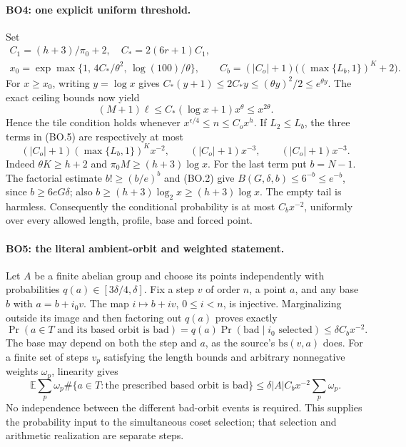 \paragraph{BO4: one explicit uniform threshold.}
Set
\[
\begin{gathered}
 C_1=(h+3)/\pi_0+2,\quad C_*=2(6r+1)C_1,\\
 x_0=\exp\max\{1,\,4C_*/\theta^2,\,\log(100)/\theta\},\qquad
 C_b=(|C_o|+1)\bigl((\max\{L_b,1\})^K+2\bigr).
\end{gathered}                                                   \tag{BO.6}
\]
For $x\ge x_0$, writing $y=\log x$ gives
$C_*(y+1)\le2C_*y\le(\theta y)^2/2\le e^{\theta y}$.
The exact ceiling bounds now yield
\[
 (M+1)\ell\le C_*(\log x+1)x^\theta
             \le x^{2\theta}.                                  \tag{BO.7}
\]
Hence the tile condition holds whenever
$x^{\epsilon/4}\le n\le C_ox^h$. If $L_2\le L_b$, the three terms
in (BO.5) are respectively at most
\[
 (|C_o|+1)(\max\{L_b,1\})^Kx^{-2},\qquad
 (|C_o|+1)x^{-3},\qquad (|C_o|+1)x^{-3}.                         \tag{BO.8}
\]
Indeed $\theta K\ge h+2$ and $\pi_0M\ge(h+3)\log x$.
For the last term put $b=N-1$. The factorial estimate
$b!\ge(b/e)^b$ and (BO.2) give
$B(G,\delta,b)\le6^{-b}\le e^{-b}$, since $b\ge6eG\delta$;
also $b\ge(h+3)\log_2x\ge(h+3)\log x$. The empty tail is harmless.
Consequently the conditional probability is at most $C_bx^{-2}$,
uniformly over every allowed length, profile, base and forced point.

\paragraph{BO5: the literal ambient-orbit and weighted statement.}
Let $A$ be a finite abelian group and choose its points independently
with probabilities $q(a)\in[3\delta/4,\delta]$. Fix a step $v$ of
order $n$, a point $a$, and any base $b$ with $a=b+i_0v$.
The map $i\mapsto b+iv$, $0\le i<n$, is injective. Marginalizing
outside its image and then factoring out $q(a)$ proves exactly
\[
 \Pr(a\in T\text{ and its based orbit is bad})
 =q(a)\Pr(\mathrm{bad}\mid i_0\text{ selected})
 \le\delta C_bx^{-2}.                                          \tag{BO.9}
\]
The base may depend on both the step and $a$, as the source's
$\mathrm{bs}(v,a)$ does. For a finite set of steps $v_p$ satisfying
the length bounds and arbitrary nonnegative weights $\omega_p$,
linearity gives
\[
 \mathbb E\sum_p\omega_p
   \#\{a\in T:\text{the prescribed based orbit is bad}\}
 \le \delta |A|C_bx^{-2}\sum_p\omega_p.                         \tag{BO.10}
\]
No independence between the different bad-orbit events is required.
This supplies the probability input to the simultaneous coset selection;
that selection and arithmetic realization are separate steps.
